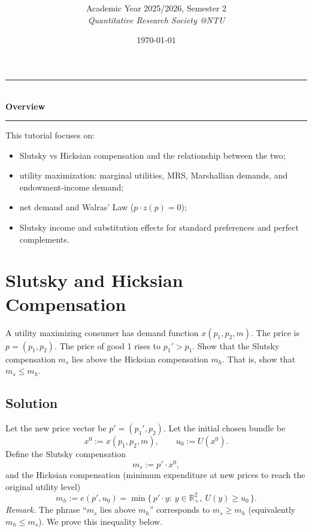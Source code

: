 \documentclass[12pt]{article}
\title{
\CourseCode \CourseName \\[0.3em]
\large \DocType
}
\author{
  Academic Year 2025/2026, Semester 2 \\[0.25em]
  \textit{Quantitative Research Society @NTU}
}
\date{\today}
\newcommand{\Rp}{\mathbb{R}_+}
\newcommand{\dotp}{\cdot}
\begin{document}
\maketitle
\thispagestyle{plainfirst}
\pagestyle{main}
\bigskip

\begin{center}
  \rule{0.8\textwidth}{0.4pt}\\[4pt]
  \textbf{Overview}\\[2pt]
  \rule{0.8\textwidth}{0.4pt}
\end{center}

\noindent
This tutorial focuses on:
\begin{itemize}[leftmargin=*]
  \item Slutsky vs Hicksian compensation and the relationship between the two;
  \item utility maximization: marginal utilities, MRS, Marshallian demands, and endowment-income demand;
  \item net demand and Walras' Law (\(p\dotp z(p)=0\));
  \item Slutsky income and substitution effects for standard preferences and perfect complements.
\end{itemize}

\bigskip

\newpage
\section{Slutsky and Hicksian Compensation}
A utility maximizing consumer has demand function \(x(p_1,p_2,m)\). The price is \(p=(p_1,p_2)\). The price of good 1 rises to \(p_1'>p_1\). Show that the Slutsky compensation \(m_s\) lies above the Hicksian compensation \(m_h\). That is, show that \(m_s \le m_h\).

\subsection*{Solution}
Let the new price vector be \(p'=(p_1',p_2)\). Let the initial chosen bundle be
\[
x^0:=x(p_1,p_2,m),\qquad u_0:=U(x^0).
\]
Define the Slutsky compensation
\[
m_s:=p'\dotp x^0,
\]
and the Hicksian compensation (minimum expenditure at new prices to reach the original utility level)
\[
m_h:=e(p',u_0)=\min\{\,p'\dotp y:\ y\in\Rp^2,\ U(y)\ge u_0\,\}.
\]
\emph{Remark.} The phrase ``\(m_s\) lies above \(m_h\)'' corresponds to \(m_s\ge m_h\) (equivalently \(m_h\le m_s\)). We prove this inequality below.
\end{document}
